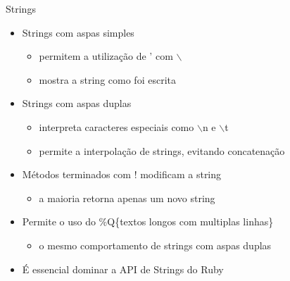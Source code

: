 
\begin{frame}{Strings}
  \begin{itemize}
    \item Strings com aspas simples
    \begin{itemize}
      \item permitem a utilização de \alert{'} com $\backslash$
      \item mostra a string como foi escrita 
    \end{itemize}
    \item Strings com aspas duplas 
    \begin{itemize}
      \item interpreta caracteres especiais como $\backslash$n e $\backslash$t
      \item permite a interpolação de strings, evitando concatenação
    \end{itemize}
  \end{itemize}
  
  
\pagebreak
  \begin{itemize}
    \item Métodos terminados com \alert{!} modificam a string
    \begin{itemize}
      \item a maioria retorna apenas um novo string
    \end{itemize}
    \item Permite o uso do \%Q\{textos longos com multiplas linhas\}
    \begin{itemize}
      \item o mesmo comportamento de strings com aspas duplas
    \end{itemize} 
    \item \alert{É essencial dominar a API de Strings do Ruby}
  \end{itemize}  
  
   
\end{frame}

